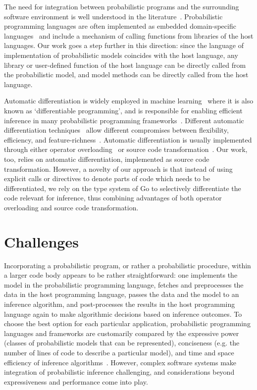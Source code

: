 \documentclass[sigplan,review,10pt,anonymous]{acmart}
\begin{document}
\begin{sloppypar}
The need for integration between probabilistic programs and the
surrounding software environment is well understood in the
literature~\cite{TMY+16,BCJ+19}. Probabilistic programming
languages are often implemented as embedded domain-specific
languages~\cite{SGG15,GXG18,TMY+16} and include a mechanism of
calling functions from libraries of the host languages. Our work
goes a step further in this direction: since the language of
implementation of probabilistic models coincides with the host
language, any library or user-defined function of the host
language can be directly called from the probabilistic model,
and model methods can be directly called from the host language.

Automatic differentiation is widely employed in machine
learning~\cite{BPR+17,MBB+18} where it is also known as
`differentiable programming', and is responsible for enabling
efficient inference in many probabilistic programming
frameworks~\cite{Stan17,GXG18,ISF+18,BCJ+19,THS+17}. Different
automatic differentiation techniques~\cite{GW08} allow 
different compromises between flexibility, efficiency, and
feature-richness~\cite{SDT14,PGC+17,ISF+18}.  Automatic
differentiation is usually implemented through either
operator overloading~\cite{Stan17,PGC+17,GXG18} or source
code transformation~\cite{ISF+18,MMW18}. Our work, too, relies
on automatic differentiation, implemented as source code
transformation. However, a novelty of our approach is that
instead of using explicit calls or directives to denote parts of
code which needs to be differentiated, we rely on the type
system of Go to selectively differentiate the code relevant for
inference, thus combining advantages of both operator
overloading and source code transformation.

\section{Challenges}
\label{sec:challenges}

Incorporating a probabilistic program, or rather a probabilistic
procedure, within a larger code body appears to be rather
straightforward: one implements the model in the probabilistic
programming language, fetches and preprocesses the data in the
host programming language, passes the data and the model to an
inference algorithm, and post-processes the results in the host
programming language again to make algorithmic decisions based
on inference outcomes. To choose the best option for each
particular application, probabilistic programming languages and
frameworks are customarily compared by the expressive power
(classes of probabilistic models that can be represented),
conciseness (e.g.  the number of lines of code to describe a
particular model), and time and space efficiency of inference
algorithms~\cite{WVM14,P16,R17,GXG18}.  However, complex
software systems make integration of probabilistic inference
challenging, and considerations beyond expressiveness
and performance come into play.


\end{sloppypar}
\end{document}
